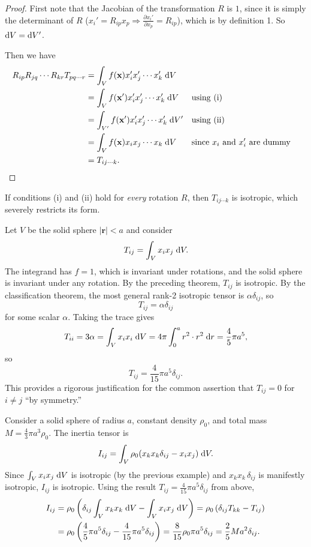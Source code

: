 \documentclass[a4paper]{article}
\begin{document}
\begin{proof}
  First note that the Jacobian of the transformation $R$ is $1$, since it is simply the determinant of $R$ ($x_i' = R_{ip}x_p \Rightarrow \frac{\partial x_i'}{\partial x_p} = R_{ip}$), which is by definition 1. So $\mathrm{d} V = \mathrm{d} V'$.

  Then we have
  \begin{align*}
    R_{ip}R_{jq}\cdots R_{kr} T_{pq\cdots r} &= \int_V f(\mathbf{x})x_i' x_j' \cdots x_k' \;\mathrm{d} V\\
    &= \int_V f(\mathbf{x}')x_i' x_j' \cdots x_k'\;\mathrm{d} V&&\text{using (i)}\\
    &= \int_{V'} f(\mathbf{x}') x_i' x_j' \cdots x_k' \;\mathrm{d} V'&&\text{using (ii)}\\
    &= \int_{V} f(\mathbf{x}) x_i x_j \cdots x_k \;\mathrm{d} V&&\text{since $x_i$ and $x_i'$ are dummy}\\
    &= T_{ij\cdots k}.\qedhere
  \end{align*}
\end{proof}

\begin{rmk}
  If conditions (i) and (ii) hold for \emph{every} rotation $R$, then $T_{ij\cdots k}$ is isotropic, which severely restricts its form.
\end{rmk}

\begin{eg}
  Let $V$ be the solid sphere $|\mathbf{r}| < a$ and consider
  \[
    T_{ij} = \int_V x_i x_j \;\mathrm{d} V.
  \]
  The integrand has $f = 1$, which is invariant under rotations, and the solid sphere is invariant under any rotation. By the preceding theorem, $T_{ij}$ is isotropic. By the classification theorem, the most general rank-2 isotropic tensor is $\alpha\delta_{ij}$, so
  \[
    T_{ij} = \alpha \delta_{ij}
  \]
  for some scalar $\alpha$. Taking the trace gives
  \[
    T_{ii} = 3\alpha = \int_V x_i x_i \;\mathrm{d} V = 4\pi \int_0^a r^2 \cdot r^2\;\mathrm{d} r = \frac{4}{5}\pi a^5,
  \]
  so
  \[
    T_{ij} = \frac{4}{15}\pi a^5 \delta_{ij}.
  \]
  This provides a rigorous justification for the common assertion that $T_{ij} = 0$ for $i \neq j$ ``by symmetry.''
\end{eg}

\begin{eg}
  Consider a solid sphere of radius $a$, constant density $\rho_0$, and total mass $M = \frac{4}{3}\pi a^3 \rho_0$. The inertia tensor is
  \[
    I_{ij} = \int_V \rho_0 (x_k x_k \delta_{ij} - x_i x_j)\;\mathrm{d} V.
  \]
  Since $\int_V x_i x_j\;\mathrm{d} V$ is isotropic (by the previous example) and $x_k x_k\,\delta_{ij}$ is manifestly isotropic, $I_{ij}$ is isotropic. Using the result $T_{ij} = \frac{4}{15}\pi a^5 \delta_{ij}$ from above,
  \begin{align*}
    I_{ij} &= \rho_0\left(\delta_{ij}\int_V x_k x_k\;\mathrm{d} V - \int_V x_ix_j \;\mathrm{d} V\right) = \rho_0\left(\delta_{ij}T_{kk} - T_{ij}\right)\\
    &= \rho_0\left(\frac{4}{5}\pi a^5\delta_{ij} - \frac{4}{15}\pi a^5 \delta_{ij}\right) = \frac{8}{15}\rho_0 \pi a^5 \delta_{ij} = \frac{2}{5}Ma^2 \delta_{ij}.
  \end{align*}
\end{eg}
\end{document}
